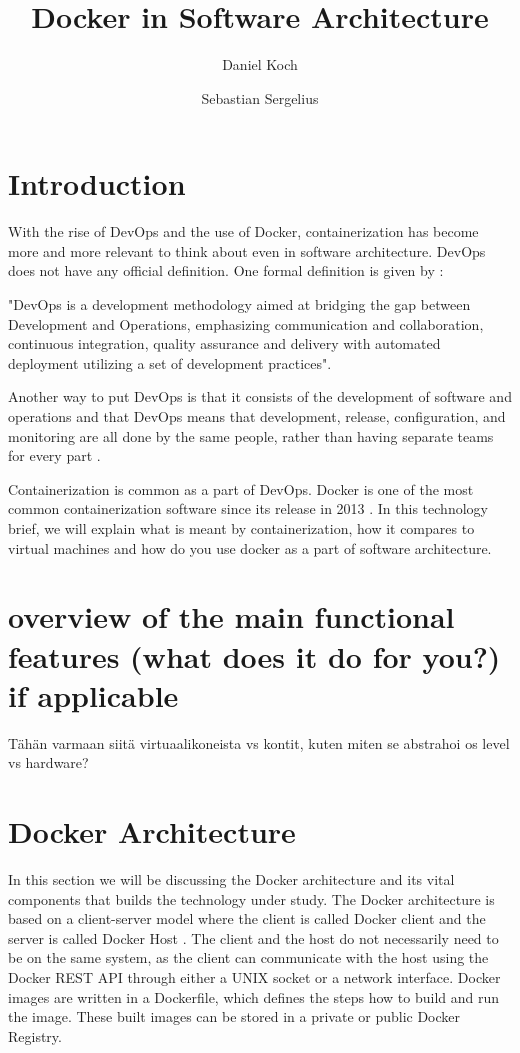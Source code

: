 \documentclass[fleqn,12pt]{olplainarticle}
\title{Docker in Software Architecture}
\author[1]{Daniel Koch}
\author[2]{Sebastian Sergelius}
\affil[1]{daniel.koch@helsinki.fi}
\affil[2]{sebastian.sergelius@helsinki.fi}
\begin{document}
\flushbottom
\maketitle
\thispagestyle{empty}
\pagebreak
\section{Introduction}

With the rise of DevOps and the use of Docker, containerization has become more and more relevant to think about even in software architecture. DevOps does not have any official definition.
One formal definition is given by \cite{Jabbari_devops}: 
\begin{displayquote}
"DevOps is a development methodology aimed at bridging the gap between Development and Operations, emphasizing communication and collaboration, continuous integration, quality assurance and delivery with automated deployment utilizing a set of development practices".
\end{displayquote}
Another way to put DevOps is that it consists of the development of software and operations and that DevOps means that development, release, configuration, and monitoring are all done by the same people, rather than having separate teams for every part \citep{hy:DevOps_with_Docker}.

Containerization is common as a part of DevOps. Docker is one of the most common containerization software since its release in 2013 \citep{aquasec:orchestration}. In this technology brief, we will explain what is meant by containerization, how it compares to virtual machines and how do you use docker as a part of software architecture.


\section{overview of the main functional features (what does it do for you?) if applicable}

Tähän varmaan siitä virtuaalikoneista vs kontit, kuten miten se abstrahoi os level vs hardware?

\section{Docker Architecture}

In this section we will be discussing the Docker architecture and its vital components that builds the technology under study. The Docker architecture is based on a client-server model where the client is called Docker client and the server is called Docker Host \citep{docker:overview, aquasec:docker_architecture}. The client and the host do not necessarily need to be on the same system, as the client can communicate with the host using the Docker REST API through either a UNIX socket or a network interface. Docker images are written in a Dockerfile, which defines the steps how to build and run the image. These built images can be stored in a private or public Docker Registry.
\end{document}
